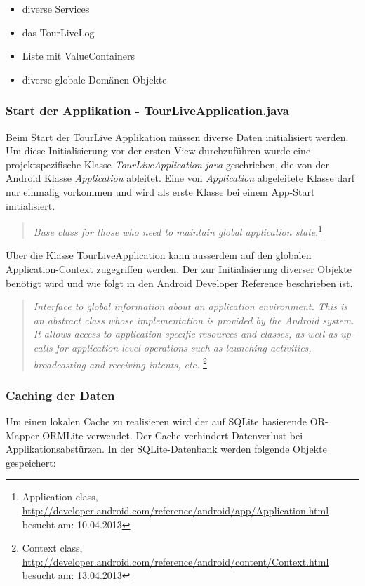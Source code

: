 \begin{itemize} [noitemsep,topsep=0pt]
	\item diverse Services
	\item das TourLiveLog
	\item Liste mit ValueContainers
	\item diverse globale Domänen Objekte
\end{itemize}

\subsubsection{Start der Applikation - TourLiveApplication.java}
Beim Start der TourLive Applikation müssen diverse Daten initialisiert werden. Um diese Initialisierung vor der ersten View durchzuführen wurde eine projektspezifische Klasse \textit{TourLiveApplication.java} geschrieben, die von der Android Klasse \textit{Application} ableitet. Eine von \textit{Application} abgeleitete Klasse darf nur einmalig vorkommen und wird als erste Klasse bei einem App-Start initialisiert.
\begin{quotation}
\textit{Base class for those who need to maintain global application state}.\footnote{Application class, \url{http://developer.android.com/reference/android/app/Application.html} besucht am: 10.04.2013}
\end{quotation}
Über die Klasse TourLiveApplication kann ausserdem auf den globalen Application-Context zugegriffen werden. Der zur Initialisierung diverser Objekte benötigt wird und wie folgt in den Android Developer Reference beschrieben ist.
\begin{quotation}
\textit{Interface to global information about an application environment. This is an abstract class whose implementation is provided by the Android system. It allows access to application-specific resources and classes, as well as up-calls for application-level operations such as launching activities, broadcasting and receiving intents, etc. }\footnote{Context class, \url{http://developer.android.com/reference/android/content/Context.html} besucht am: 13.04.2013}
\end{quotation}

\subsubsection{Caching der Daten}
Um einen lokalen Cache zu realisieren wird der auf SQLite basierende OR-Mapper ORMLite verwendet. Der Cache verhindert Datenverlust bei Applikationsabstürzen. In der SQLite-Datenbank werden folgende Objekte gespeichert:

